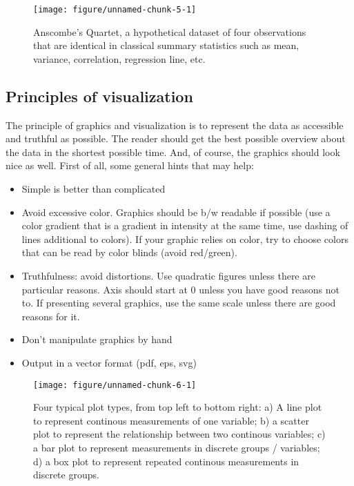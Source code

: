 \documentclass[a4paper,twoside]{tufte-book}\usepackage[]{graphicx}\usepackage[]{color}
\makeatletter
\def\maxwidth{ %
  \ifdim\Gin@nat@width>\linewidth
    \linewidth
  \else
    \Gin@nat@width
  \fi
}
\makeatother
\begin{document}
\begin{figure}[htbp]
\begin{center}
\begin{Schunk}

\texttt{[image: figure/unnamed-chunk-5-1]} \end{Schunk}
\caption{Anscombe's Quartet, a hypothetical dataset of four observations that are identical in classical summary statistics such as mean, variance, correlation, regression line, etc.}
\label{fig: Anscombes Quartet}
\end{center}
\end{figure}


\subsection{Principles of visualization}

The principle of graphics and visualization is to represent the data as accessible and truthful as possible. The reader should get the best possible overview about the data in the shortest possible time. And, of course, the graphics should look nice as well. First of all, some general hints that may help:

\begin{itemize}
\item Simple is better than complicated
\item Avoid excessive color. Graphics should be b/w readable if possible (use a color gradient that is a gradient in intensity at the same time, use dashing of lines additional to colors). If your graphic relies on color, try to choose colors that can be read by color blinds (avoid red/green).
\item Truthfulness: avoid distortions. Use quadratic figures unless there are particular reasons. Axis should start at 0 unless you have good reasons not to. If presenting several graphics, use the same scale unless there are good reasons for it. 
\item Don't manipulate graphics by hand
\item Output in a vector format (pdf, eps, svg)
\end{itemize}

\begin{figure}[htbp]
\begin{center}

\begin{Schunk}

\texttt{[image: figure/unnamed-chunk-6-1]} \end{Schunk}
\caption{Four typical plot types, from top left to bottom right: a) A line plot to represent continous measurements of one variable; b) a scatter plot to represent the relationship between two continous variables; c) a bar plot to represent measurements in discrete groups / variables; d) a box plot to represent repeated continous measurements in discrete groups.}
\label{fig: exaple plots}
\end{center}
\end{figure}
\end{document}
